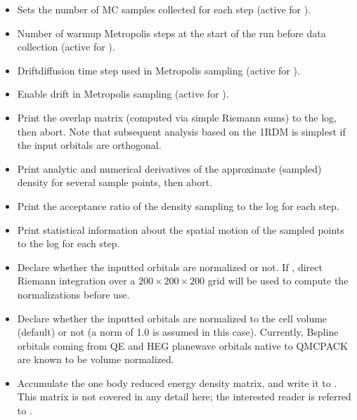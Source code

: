 \documentclass[letterpaper,10pt,english]{sphinxmanual}
\begin{document}
\begin{itemize}
\item {} 
 Sets the number of MC samples collected for each step
(active for ).

\item {} 
 Number of warmup Metropolis steps at the start of the run
before data collection (active for ).

\item {} 
 Drift\sphinxhyphen{}diffusion time step used in Metropolis sampling
(active for ).

\item {} 
 Enable drift in Metropolis sampling (active for
).

\item {} 
 Print the overlap matrix (computed via simple
Riemann sums) to the log, then abort. Note that subsequent analysis
based on the 1RDM is simplest if the input orbitals are orthogonal.

\item {} 
 Print analytic and numerical derivatives of
the approximate (sampled) density for several sample points, then
abort.

\item {} 
 Print the acceptance ratio of the density
sampling to the log for each step.

\item {} 
 Print statistical information about the spatial motion of
the sampled points to the log for each step.

\item {} 
 Declare whether the inputted orbitals are normalized
or not. If , direct Riemann integration over a
\(200 \times 200 \times 200\) grid will be used to compute the
normalizations before use.

\item {} 
 Declare whether the inputted orbitals are
normalized to the cell volume (default) or not (a norm of 1.0 is
assumed in this case). Currently, B\sphinxhyphen{}spline orbitals coming from QE
and HEG planewave orbitals native to QMCPACK are known to be volume
normalized.

\item {} 
 Accumulate the one body reduced energy density
matrix, and write it to . This matrix is not covered in
any detail here; the interested reader is referred to
.

\end{itemize}
\end{document}
